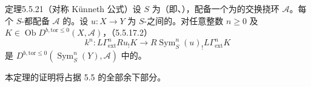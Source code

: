 \begin{SGAresult}{定理}{5.5.21（对称 Künneth 公式）}设 $S$ 为（即、），配备一个为的交换挠环 $\mathscr A$。每个 $S$-都配备 $\mathscr A$ 的。设 $u:X\to Y$ 为 $S$-之间的。对任意整数 $n\geq0$ 及 $K\in\operatorname{Ob}D^{b,\mathrm{tor}\leq0}(X,\mathscr A)$，（5.5.17.2）
\[k^n:L\Gamma^n_{\mathrm{ext}}Ru_!K\longrightarrow R\operatorname{Sym}^n_S(u)_!L\Gamma^n_{\mathrm{ext}}K\]
是 $D^{b,\mathrm{tor}\leq0}(\operatorname{Sym}^n_S(Y),\mathscr A)$ 中的。
\end{SGAresult}
本定理的证明将占据 5.5 的全部余下部分。

